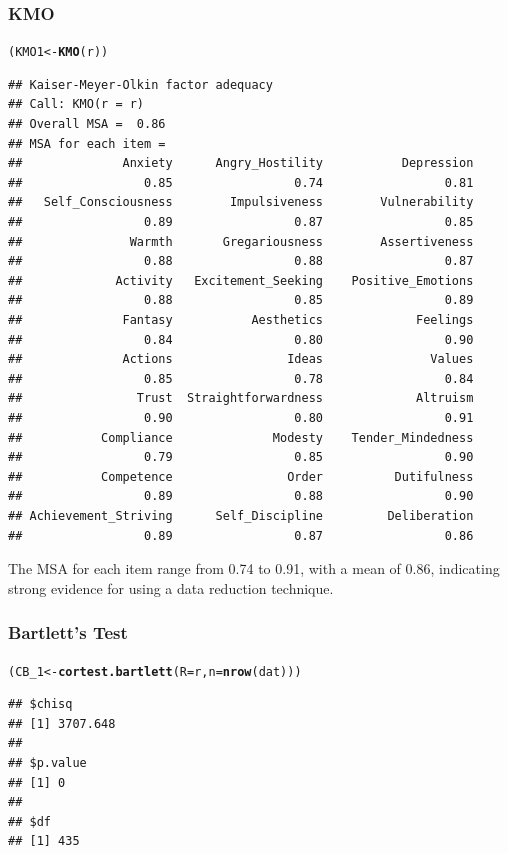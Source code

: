 \documentclass{article}\usepackage[]{graphicx}\usepackage[]{color}
\makeatletter
\newcommand{\hlstd}[1]{\textcolor[rgb]{0.345,0.345,0.345}{#1}}%
\newcommand{\hlkwb}[1]{\textcolor[rgb]{0.69,0.353,0.396}{#1}}%
\newcommand{\hlkwc}[1]{\textcolor[rgb]{0.333,0.667,0.333}{#1}}%
\newcommand{\hlkwd}[1]{\textcolor[rgb]{0.737,0.353,0.396}{\textbf{#1}}}%
\newenvironment{kframe}{%
 \def\at@end@of@kframe{}%
 \ifinner\ifhmode%
  \def\at@end@of@kframe{\end{minipage}}%
  \begin{minipage}{\columnwidth}%
 \fi\fi%
 \def\FrameCommand##1{\hskip\@totalleftmargin \hskip-\fboxsep
 \colorbox{shadecolor}{##1}\hskip-\fboxsep
     \hskip-\linewidth \hskip-\@totalleftmargin \hskip\columnwidth}%
 \MakeFramed {\advance\hsize-\width
   \@totalleftmargin\z@ \linewidth\hsize
   \@setminipage}}%
 {\par\unskip\endMakeFramed%
 \at@end@of@kframe}
\newenvironment{knitrout}{}{} %
\makeatother
\begin{document}
\subsubsection{KMO}
\begin{knitrout}
\color{fgcolor}\begin{kframe}
\begin{alltt}
\hlstd{(KMO1} \hlkwb{<-} \hlkwd{KMO}\hlstd{(r))}
\end{alltt}
\begin{verbatim}
## Kaiser-Meyer-Olkin factor adequacy
## Call: KMO(r = r)
## Overall MSA =  0.86
## MSA for each item = 
##              Anxiety      Angry_Hostility           Depression 
##                 0.85                 0.74                 0.81 
##   Self_Consciousness        Impulsiveness        Vulnerability 
##                 0.89                 0.87                 0.85 
##               Warmth       Gregariousness        Assertiveness 
##                 0.88                 0.88                 0.87 
##             Activity   Excitement_Seeking    Positive_Emotions 
##                 0.88                 0.85                 0.89 
##              Fantasy           Aesthetics             Feelings 
##                 0.84                 0.80                 0.90 
##              Actions                Ideas               Values 
##                 0.85                 0.78                 0.84 
##                Trust  Straightforwardness             Altruism 
##                 0.90                 0.80                 0.91 
##           Compliance              Modesty    Tender_Mindedness 
##                 0.79                 0.85                 0.90 
##           Competence                Order          Dutifulness 
##                 0.89                 0.88                 0.90 
## Achievement_Striving      Self_Discipline         Deliberation 
##                 0.89                 0.87                 0.86
\end{verbatim}
\end{kframe}
\end{knitrout}

The MSA for each item range from 0.74 to 0.91, with a mean of 0.86, indicating strong evidence for using a data reduction technique. 

\subsubsection{Bartlett's Test}
\begin{knitrout}
\color{fgcolor}\begin{kframe}
\begin{alltt}
\hlstd{(CB_1} \hlkwb{<-} \hlkwd{cortest.bartlett}\hlstd{(}\hlkwc{R}\hlstd{=r,}\hlkwc{n}\hlstd{=}\hlkwd{nrow}\hlstd{(dat)))}
\end{alltt}
\begin{verbatim}
## $chisq
## [1] 3707.648
## 
## $p.value
## [1] 0
## 
## $df
## [1] 435
\end{verbatim}
\end{kframe}
\end{knitrout}
\end{document}
